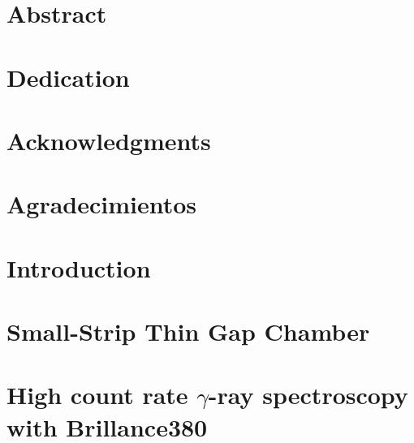 








\chapter*{Abstract}



\chapter*{Dedication}


\chapter*{Acknowledgments}
\chapter*{Agradecimientos}


\tableofcontents


\chapter{Introduction}



\chapter{Small-Strip Thin Gap Chamber}



\chapter{High count rate $\gamma$-ray spectroscopy with Brillance380 }


